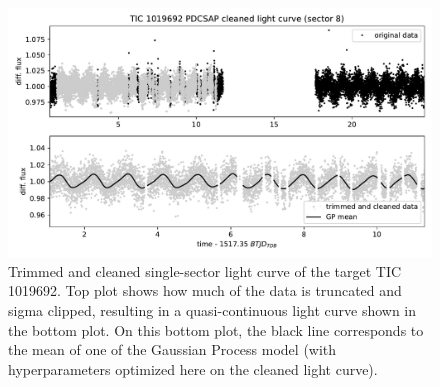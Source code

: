 \documentclass{aastex631}
\begin{document}
\begin{figure}[H]
    \centering
    \includegraphics[width=0.9\linewidth]{../workflows/tess_injection_recovery/figures/cleaned/1019692.pdf}
    \caption{Trimmed and cleaned single-sector light curve of the target TIC 1019692. Top plot shows how much of the data is truncated and sigma clipped, resulting in a quasi-continuous light curve shown in the bottom plot. On this bottom plot, the black line corresponds to the mean of one of the Gaussian Process model (with hyperparameters optimized here on the cleaned light curve).}
    \label{fig:cleaned}
\end{figure}
\end{document}

